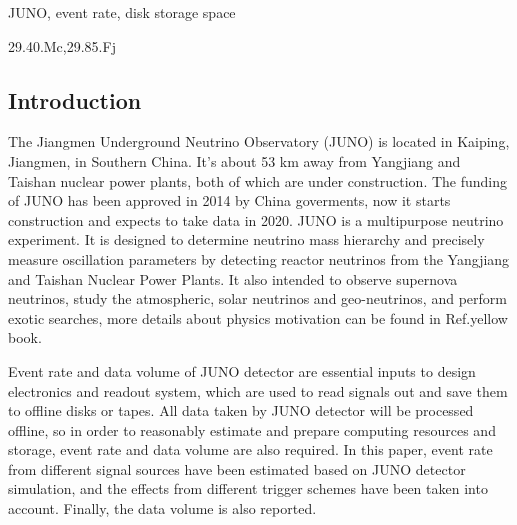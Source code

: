 \documentclass[a4paper,10pt,twoside]{paper}
\begin{document}
	\begin{keyword}
		JUNO, event rate, disk storage space
	\end{keyword}

	\begin{pacs}
		29.40.Mc,29.85.Fj
	\end{pacs}


	\begin{multicols}{2}

		\section{Introduction}
                The Jiangmen Underground Neutrino Observatory (JUNO) is located in Kaiping, Jiangmen, in Southern China.
                It's about 53 km away from Yangjiang and Taishan nuclear power plants, both of which are under construction.
                The funding of JUNO has been approved in 2014 by China goverments, now it starts construction and expects to take data in 2020.
		JUNO\cite{lab1} is a multipurpose neutrino experiment. It is
		designed to determine neutrino mass hierarchy and precisely
		measure oscillation parameters by detecting reactor
		neutrinos from the Yangjiang and Taishan Nuclear Power
		Plants. It also intended to observe supernova neutrinos,
		study the atmospheric, solar neutrinos and geo-neutrinos,
		and perform exotic searches, more details about physics motivation can be found in Ref.yellow book. 

                Event rate and data volume of JUNO detector are essential inputs to design electronics and readout system, 
                which are used to read signals out and save them to offline disks or tapes. 
                All data taken by JUNO detector will be processed offline, so in order to reasonably estimate and prepare computing resources and storage, 
                event rate and data volume are also required.
                In this paper, event rate from different signal sources have been estimated based on JUNO detector simulation, 
                and the effects from different trigger schemes have been taken into account. Finally, the data volume is also reported.


\end{multicols}
\end{document}
